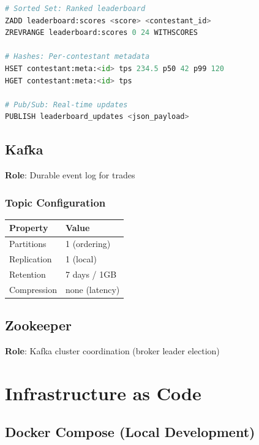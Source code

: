 \documentclass[10pt,a4paper,oneside]{report}
\begin{document}
\begin{lstlisting}[language=python]
# Sorted Set: Ranked leaderboard
ZADD leaderboard:scores <score> <contestant_id>
ZREVRANGE leaderboard:scores 0 24 WITHSCORES

# Hashes: Per-contestant metadata
HSET contestant:meta:<id> tps 234.5 p50 42 p99 120
HGET contestant:meta:<id> tps

# Pub/Sub: Real-time updates
PUBLISH leaderboard_updates <json_payload>
\end{lstlisting}

\section{Kafka}

\textbf{Role}: Durable event log for trades

\subsection{Topic Configuration}

\begin{table}[H]\small
    \centering
    \begin{tabular}{ll}
    \toprule
    \textbf{Property} & \textbf{Value} \\
    \midrule
    Partitions & 1 (ordering) \\
    Replication & 1 (local) \\
    Retention & 7 days / 1GB \\
    Compression & none (latency) \\
    \bottomrule
    \end{tabular}
\end{table}

\section{Zookeeper}

\textbf{Role}: Kafka cluster coordination (broker leader election)

\chapter{Infrastructure as Code}

\section{Docker Compose (Local Development)}
\end{document}
